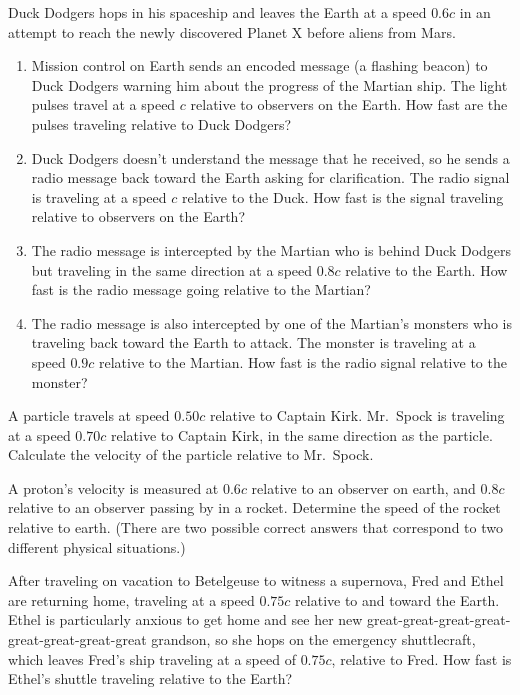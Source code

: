 \begin{problem}
Duck Dodgers hops in his spaceship and leaves the Earth at a
speed $0.6c$ in an attempt to reach the newly discovered Planet X before
aliens from Mars.
    \begin{enumerate}
    \item Mission control on Earth sends an encoded message (a
    flashing beacon) to Duck Dodgers warning him about the progress of
    the Martian ship.  The light pulses travel at a speed $c$ relative
    to observers on the Earth.  How fast are the pulses traveling
    relative to Duck Dodgers?
    \item Duck Dodgers doesn't understand the message that he
    received, so he sends a radio message back toward the Earth asking
    for clarification.  The radio signal is traveling at a speed $c$
    relative to the Duck.  How fast is the signal traveling relative
    to observers on the Earth?
    \item The radio message is intercepted by the Martian who is
    behind Duck Dodgers but traveling in the same direction at a speed
    $0.8c$ relative to the Earth.  How fast is the radio message going
    relative to the Martian?
    \item The radio message is also intercepted by one of the
    Martian's monsters who is traveling back toward the Earth to
    attack.  The monster is traveling at a speed $0.9c$ relative to the
    Martian.  How fast is the radio signal relative to the monster?
    \end{enumerate}
\end{problem}

\begin{problem}
A particle travels at speed $0.50c$ relative to Captain Kirk.
Mr.\ Spock is traveling at a speed $0.70c$ relative to Captain Kirk,
in the same direction as the particle.
Calculate the velocity of the particle relative to Mr.\ Spock.
\label{prob:vtransform}
\end{problem}

\begin{problem}
A proton's velocity is measured at $0.6c$ relative to an observer
on earth, and $0.8c$ relative to an observer passing by in a rocket.
Determine the speed of the rocket relative to earth.  (There 
are two possible correct answers that correspond to two different
physical situations.)
\label{prob:vtransform2}
\end{problem}

\begin{problem}
After traveling on vacation to Betelgeuse to witness a supernova, Fred
and Ethel are returning home, traveling at a speed $0.75c$ relative to
and toward the Earth.  Ethel is particularly anxious to get home and
see her new great-great-great-great-great-great-great-great grandson,
so she hops on the emergency shuttlecraft, which leaves Fred's ship
traveling at a speed of $0.75c$, relative to Fred.  How fast is Ethel's
shuttle traveling relative to the Earth?
\end{problem}

